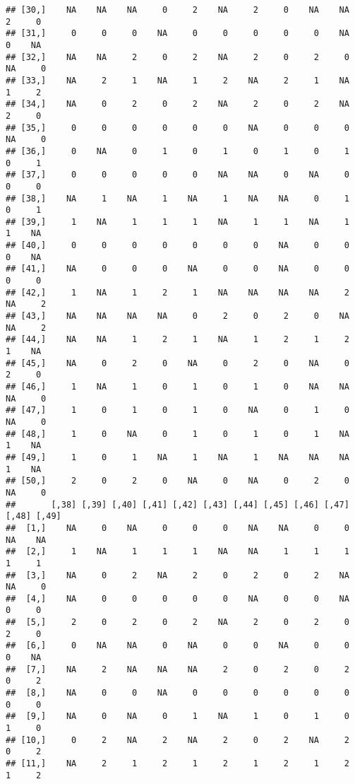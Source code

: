 \documentclass[
]{article}
\begin{document}
\begin{verbatim}
## [30,]    NA    NA    NA     0     2    NA     2     0    NA    NA     2     0
## [31,]     0     0     0    NA     0     0     0     0     0    NA     0    NA
## [32,]    NA    NA     2     0     2    NA     2     0     2     0    NA     0
## [33,]    NA     2     1    NA     1     2    NA     2     1    NA     1     2
## [34,]    NA     0     2     0     2    NA     2     0     2    NA     2     0
## [35,]     0     0     0     0     0     0    NA     0     0     0    NA     0
## [36,]     0    NA     0     1     0     1     0     1     0     1     0     1
## [37,]     0     0     0     0     0    NA    NA     0    NA     0     0     0
## [38,]    NA     1    NA     1    NA     1    NA    NA     0     1     0     1
## [39,]     1    NA     1     1     1    NA     1     1    NA     1     1    NA
## [40,]     0     0     0     0     0     0     0    NA     0     0     0    NA
## [41,]    NA     0     0     0    NA     0     0    NA     0     0     0     0
## [42,]     1    NA     1     2     1    NA    NA    NA    NA     2    NA     2
## [43,]    NA    NA    NA    NA     0     2     0     2     0    NA    NA     2
## [44,]    NA    NA     1     2     1    NA     1     2     1     2     1    NA
## [45,]    NA     0     2     0    NA     0     2     0    NA     0     2     0
## [46,]     1    NA     1     0     1     0     1     0    NA    NA    NA     0
## [47,]     1     0     1     0     1     0    NA     0     1     0    NA     0
## [48,]     1     0    NA     0     1     0     1     0     1    NA     1    NA
## [49,]     1     0     1    NA     1    NA     1    NA    NA    NA     1    NA
## [50,]     2     0     2     0    NA     0    NA     0     2     0    NA     0
##       [,38] [,39] [,40] [,41] [,42] [,43] [,44] [,45] [,46] [,47] [,48] [,49]
##  [1,]    NA     0    NA     0     0     0    NA    NA     0     0    NA    NA
##  [2,]     1    NA     1     1     1    NA    NA     1     1     1     1     1
##  [3,]    NA     0     2    NA     2     0     2     0     2    NA    NA     0
##  [4,]    NA     0     0     0     0     0    NA     0     0    NA     0     0
##  [5,]     2     0     2     0     2    NA     2     0     2     0     2     0
##  [6,]     0    NA    NA     0    NA     0     0    NA     0     0     0    NA
##  [7,]    NA     2    NA    NA    NA     2     0     2     0     2     0     2
##  [8,]    NA     0     0    NA     0     0     0     0     0     0     0     0
##  [9,]    NA     0    NA     0     1    NA     1     0     1     0     1     0
## [10,]     0     2    NA     2    NA     2     0     2    NA     2     0     2
## [11,]    NA     2     1     2     1     2     1     2     1     2     1     2

\end{verbatim}
\end{document}
